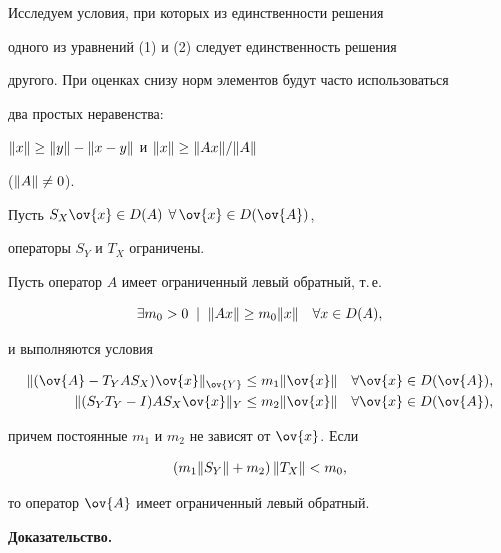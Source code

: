 Исследуем условия, при которых из единственности решения


одного из уравнений (1) и (2) следует единственность решения


другого. При оценках снизу норм элементов будут часто использоваться


два простых неравенства:


$\| {x} \| \ge \| {y} \| - \| {x-y} \|$ и $\| {x} \| \ge \| {Ax} \|/\| {A} \|$


($\| {A} \| \ne 0$).





\begin{thm}


Пусть $S_X\ov{x}\in D(A)$ $\forall\,\ov{x}\in D(\ov{A})$,


операторы $S_Y$ и $T_X$ ограничены.


Пусть оператор $A$ имеет ограниченный левый обратный, т.\,е.


\begin{equation}


\exists m_0>0 \;\mid\; \nr{Ax}\ge m_0\nr{x}


\quad \forall x\in D(A),


\end{equation}


и выполняются условия


\begin{align}


\nr{(\ov{A} - T_YAS_X)\ov{x} }_{\ov{Y}} &\le m_1\nr{\ov{x}}


\quad \forall \ov{x} \in D(\ov{A}),\\


%


\nr{(S_YT_Y-I)AS_X\ov{x}}_Y &\le m_2\nr{\ov{x}}


 \quad \forall \ov{x} \in D(\ov{A}),


\end{align}


причем постоянные $m_1$ и $m_2$ не зависят от $\ov{x}$. Если


$$


(m_1\nr{S_Y} + m_2)\,\nr{T_X} < m_0,


$$


то оператор $\ov{A}$ имеет ограниченный левый обратный.


\end{thm}





{\bf Доказательство.}


